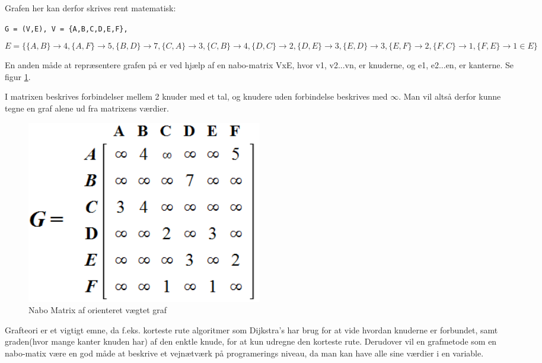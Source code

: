 Grafen her kan derfor skrives rent matematisk:

\vspace{5mm}

\verb!G = (V,E), V = {A,B,C,D,E,F},! 

\vspace{5mm}

\begin{equation}\label{grafteori}
E = \{ \{A,B\} \rightarrow 4, \{A,F\} \rightarrow 5, \{B,D\} \rightarrow 7, \{C,A\} \rightarrow 3, \{C,B\} \rightarrow 4, \{D,C\} \rightarrow 2, \{D,E\} \rightarrow 3, \{E,D\} \rightarrow 3, \{E,F\} \rightarrow 2, \{F,C\} \rightarrow 1, \{F,E\} \rightarrow 1 \in  E\}
\end{equation}

\vspace{5mm}

En anden måde at repræsentere grafen på er ved hjælp af en nabo-matrix VxE, hvor v1, v2...vn, er knuderne, og e1, e2...en, er kanterne. Se figur \ref{fig:adjacency-matrix-weighted-directed-graph}. 

I matrixen beskrives forbindelser mellem 2 knuder med et tal, og knudere uden forbindelse beskrives med $\infty$. Man vil altså derfor kunne tegne en graf alene ud fra matrixens værdier.

\begin{figure}[H]
\begin{adjustbox}{width=0.5\textwidth,center=\textwidth}
\centering
\includegraphics[width=0.5\textwidth]{Pictures/Teoriafsnit/Figurfiler/adjacency_matrix_weighted_directed_graph.PNG}
\end{adjustbox}
\caption{Nabo Matrix af orienteret vægtet graf}
\label{fig:adjacency-matrix-weighted-directed-graph}
\end{figure}

Grafteori er et vigtigt emne, da f.eks. korteste rute algoritmer som Dijkstra's har brug for at vide hvordan knuderne er forbundet, samt graden(hvor mange kanter knuden har) af den enktle knude, for at kun udregne den korteste rute. Derudover vil en grafmetode som en nabo-matix være en god måde at beskrive et vejnætværk på programerings niveau, da man kan have alle sine værdier i en variable.


